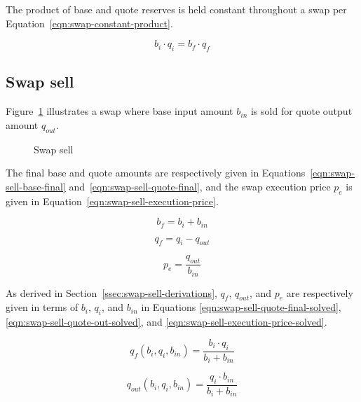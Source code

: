 \documentclass[table, twocolumn]{article}
\begin{document}
The product of base and quote reserves is held constant throughout a swap per
Equation~\ref{eqn:swap-constant-product}.

\begin{equation}\label{eqn:swap-constant-product}
	b_i \cdot q_i = b_f \cdot q_f
\end{equation}

\subsection{Swap sell}\label{ssec:swap-sell}

Figure~\ref{fig:swap-sell} illustrates a swap where base input amount $b_{in}$ is sold
for quote output amount $q_{out}$.

\begin{figure}[!htb]
	\centering
	
	\caption{Swap sell}\label{fig:swap-sell}
\end{figure}

The final base and quote amounts are respectively given in
Equations~\ref{eqn:swap-sell-base-final} and~\ref{eqn:swap-sell-quote-final}, and the
swap execution price $p_e$ is given in Equation~\ref{eqn:swap-sell-execution-price}.

\begin{equation}\label{eqn:swap-sell-base-final}
	b_f = b_i + b_{in}
\end{equation}

\begin{equation}\label{eqn:swap-sell-quote-final}
	q_f = q_i - q_{out}
\end{equation}

\begin{equation}\label{eqn:swap-sell-execution-price}
	p_e = \frac{q_{out}}{b_{in}}
\end{equation}

As derived in Section~\ref{ssec:swap-sell-derivations}, $q_f$, $q_{out}$, and $p_e$ are
respectively given in terms of $b_i$, $q_i$, and $b_{in}$ in Equations
\ref{eqn:swap-sell-quote-final-solved},
\ref{eqn:swap-sell-quote-out-solved}, and
\ref{eqn:swap-sell-execution-price-solved}.

\begin{equation}\label{eqn:swap-sell-quote-final-solved}
	q_f(b_i, q_i, b_{in}) = \frac{b_i \cdot q_i}{b_i + b_{in}}
\end{equation}

\begin{equation}\label{eqn:swap-sell-quote-out-solved}
	q_{out} (b_i, q_i, b_{in}) = \frac{q_i \cdot b_{in}}{b_i + b_{in}}
\end{equation}
\end{document}
